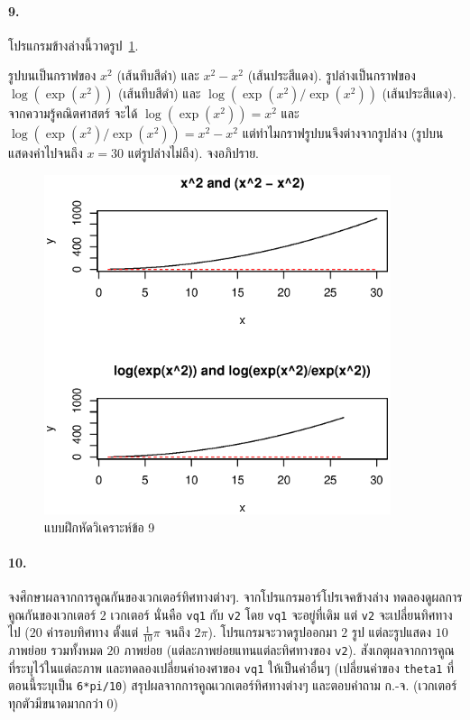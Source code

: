 \paragraph{9.} %
โปรแกรมข้างล่างนี้วาดรูป~\ref{fig: R plot ex6}.


รูปบนเป็นกราฟของ $x^2$ (เส้นทึบสีดำ) และ $x^2 - x^2$ (เส้นประสีแดง).
รูปล่างเป็นกราฟของ $\log(\exp(x^2))$ (เส้นทึบสีดำ) และ $\log(\exp(x^2)/\exp(x^2))$ (เส้นประสีแดง).
จากความรู้คณิตศาสตร์ จะได้ $\log(\exp(x^2)) = x^2$ และ $\log(\exp(x^2)/\exp(x^2)) = x^2 - x^2$ 
แต่ทำไมกราฟรูปบนจึงต่างจากรูปล่าง (รูปบนแสดงค่าไปจนถึง $x = 30$ แต่รูปล่างไม่ถึง). 
จงอภิปราย.

%
\begin{figure}
\begin{center}
\includegraphics[width=4.0in]
{01Intro/RplotEx6.eps}
\end{center}
\caption{แบบฝึกหัดวิเคราะห์ข้อ 9}
\label{fig: R plot ex6}
\end{figure}
%

\paragraph{10.} จงศึกษาผลจากการคูณกันของเวกเตอร์ทิศทางต่างๆ.
จากโปรแกรมอาร์โปรเจคข้างล่าง ทดลองดูผลการคูณกันของเวกเตอร์ $2$ เวกเตอร์
นั่นคือ \verb|vq1| กับ \verb|v2|
โดย \verb|vq1| จะอยู่ที่เดิม แต่ \verb|v2| จะเปลี่ยนทิศทางไป ($20$ ค่ารอบทิศทาง ตั้งแต่ $\frac{1}{10}\pi$ จนถึง $2 \pi$).
โปรแกรมจะวาดรูปออกมา $2$ รูป 
แต่ละรูปแสดง $10$ ภาพย่อย
รวมทั้งหมด $20$ ภาพย่อย (แต่ละภาพย่อยแทนแต่ละทิศทางของ \verb|v2|).
สังเกตุผลจากการคูณ ที่ระบุไว้ในแต่ละภาพ และทดลองเปลี่ยนค่าองศาของ \verb|vq1| ให้เป็นค่าอื่นๆ (เปลี่ยนค่าของ \verb|theta1| ที่ตอนนี้ระบุเป็น \verb|6*pi/10|)
สรุปผลจากการคูณเวกเตอร์ทิศทางต่างๆ และตอบคำถาม ก.-จ. (เวกเตอร์ทุกตัวมีขนาดมากกว่า $0$)



